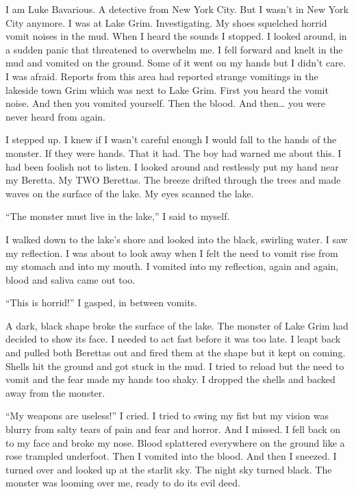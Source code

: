 I am Luke Bavarious. A detective from New York City. But I
wasn't in New York City anymore. I was at Lake Grim.
Investigating. My shoes squelched horrid vomit noises in the mud.
When I heard the sounds I stopped. I looked around, in a sudden
panic that threatened to overwhelm me. I fell forward and knelt in
the mud and vomited on the ground. Some of it went on my hands but
I didn't care. I was afraid. Reports from this area had
reported strange vomitings in the lakeside town Grim which was next
to Lake Grim. First you heard the vomit noise. And then you vomited
yourself. Then the blood. And then{\ldots} you were never heard
from again.



I stepped up. I knew if I wasn't careful enough I would fall
to the hands of the monster. If they were hands. That it had. The
boy had warned me about this. I had been foolish not to listen. I
looked around and restlessly put my hand near my Beretta. My TWO
Berettas. The breeze drifted through the trees and made waves on
the surface of the lake. My eyes scanned the lake.



``The monster must live in the lake,'' I said to
myself.



I walked down to the lake's shore and looked into the black,
swirling water. I saw my reflection. I was about to look away when
I felt the need to vomit rise from my stomach and into my mouth. I
vomited into my reflection, again and again, blood and saliva came
out too.



``This is horrid!'' I gasped, in between vomits.



A dark, black shape broke the surface of the lake. The monster of
Lake Grim had decided to show its face. I needed to act fast before
it was too late. I leapt back and pulled both Berettas out and
fired them at the shape but it kept on coming. Shells hit the
ground and got stuck in the mud. I tried to reload but the need to
vomit and the fear made my hands too shaky. I dropped the shells
and backed away from the monster.



``My weapons are useless!'' I cried. I tried to swing my
fist but my vision was blurry from salty tears of pain and fear and
horror. And I missed. I fell back on to my face and broke my nose.
Blood splattered everywhere on the ground like a rose trampled
underfoot. Then I vomited into the blood. And then I sneezed. I
turned over and looked up at the starlit sky. The night sky turned
black. The monster was looming over me, ready to do its evil
deed.




